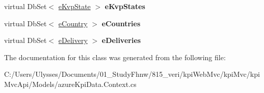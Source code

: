 \begin{DoxyCompactItemize}
virtual Db\+Set$<$ \hyperlink{classkpi_mvc_api_1_1_models_1_1e_kvp_state}{e\+Kvp\+State} $>$ {\bfseries e\+Kvp\+States}
\item 
\mbox{\label{classkpi_mvc_api_1_1_models_1_1kpidb_entities1_a4dc3f1977f03dcb917bb6b2e22fb069b}} 
virtual Db\+Set$<$ \hyperlink{classkpi_mvc_api_1_1_models_1_1e_country}{e\+Country} $>$ {\bfseries e\+Countries}
\item 
\mbox{\label{classkpi_mvc_api_1_1_models_1_1kpidb_entities1_aa8003f98fa22ca806d4a4d989e9b8cbb}} 
virtual Db\+Set$<$ \hyperlink{classkpi_mvc_api_1_1_models_1_1e_delivery}{e\+Delivery} $>$ {\bfseries e\+Deliveries}
\end{DoxyCompactItemize}


The documentation for this class was generated from the following file\+:\begin{DoxyCompactItemize}
\item 
C\+:/\+Users/\+Ulysses/\+Documents/01\+\_\+\+Study\+Fhnw/815\+\_\+veri/kpi\+Web\+Mvc/kpi\+Mvc/kpi\+Mvc\+Api/\+Models/azure\+Kpi\+Data.\+Context.\+cs\end{DoxyCompactItemize}
